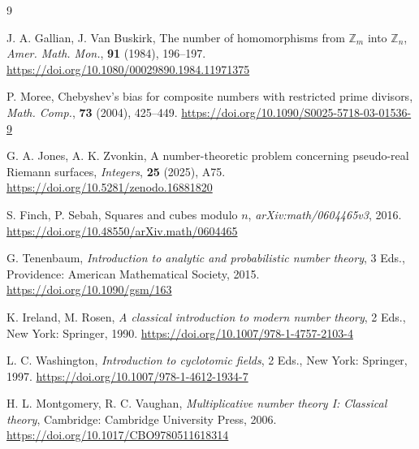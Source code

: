 \documentclass[11pt]{article}
\theoremstyle{definition}
\newcommand{\Z}{\mathbb{Z}}
\begin{document}
\begin{thebibliography}{9}
\setlength{\itemsep}{1pt}
\small

J. A. Gallian, J. Van Buskirk, The number of homomorphisms from $\Z_m$ into $\Z_n$, \textit{Amer. Math. Mon.}, \textbf{91} (1984), 196--197. \url{https://doi.org/10.1080/00029890.1984.11971375}

P. Moree, Chebyshev's bias for composite numbers with restricted prime divisors, \textit{Math. Comp.}, \textbf{73} (2004), 425--449. \url{https://doi.org/10.1090/S0025-5718-03-01536-9}

G. A. Jones, A. K. Zvonkin, A number-theoretic problem concerning pseudo-real Riemann surfaces, \textit{Integers}, \textbf{25} (2025), A75. \url{https://doi.org/10.5281/zenodo.16881820}

S. Finch, P. Sebah, Squares and cubes modulo $n$, \textit{arXiv:math/0604465v3}, 2016. \url{https://doi.org/10.48550/arXiv.math/0604465}

G. Tenenbaum, \textit{Introduction to analytic and probabilistic number theory}, 3 Eds., Providence: American Mathematical Society, 2015. \url{https://doi.org/10.1090/gsm/163}

K. Ireland, M. Rosen, \textit{A classical introduction to modern number theory}, 2 Eds., New York: Springer, 1990. \url{https://doi.org/10.1007/978-1-4757-2103-4}

L. C. Washington, \textit{Introduction to cyclotomic fields}, 2 Eds., New York: Springer, 1997. \url{https://doi.org/10.1007/978-1-4612-1934-7}

H. L. Montgomery, R. C. Vaughan, \textit{Multiplicative number theory I: Classical theory}, Cambridge: Cambridge University Press, 2006. \url{https://doi.org/10.1017/CBO9780511618314}

\end{thebibliography}
\end{document}
